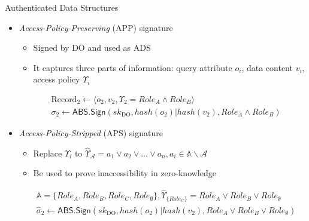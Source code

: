 \documentclass[xcolor={dvipsnames},aspectratio=169,10pt]{beamer}
\begin{document}
\begin{frame}{Authenticated Data Structures}
  \begin{itemize}
    \item<+-> \emph{Access-Policy-Preserving} (APP) signature
      \begin{itemize}
        \item Signed by DO and used as \alert{ADS}
        \item It captures three parts of information: \alert{query attribute $o_i$}, \alert{data content $v_i$}, \alert{access policy $\Upsilon_i$}
      \end{itemize}
      \begin{example}
        \begin{align*}
         & \text{Record}_2 \gets \langle o_2, v_2, \Upsilon_2 = {Role}_A \land {Role}_B \rangle                  \\
         & \sigma_2 \gets \textsf{ABS.Sign}({sk}_{\textrm{DO}}, hash(o_2) | hash(v_2) , {Role}_A \land {Role}_B)
        \end{align*}
      \end{example}
    \item<+-> \emph{Access-Policy-Stripped} (APS) signature
      \begin{itemize}
        \item Replace $\Upsilon_i$ to \alert{$\hat{\Upsilon}_{\mathcal{A}} = a_1 \lor a_2 \lor \dots \lor a_n, a_i \in \mathbb{A}\backslash\mathcal{A}$}
        \item Be used to prove inaccessibility in \alert{zero-knowledge}
      \end{itemize}
      \begin{example}
        \begin{align*}
         & \mathbb{A} = \{ {Role}_A, {Role}_B, {Role}_C, {Role}_\emptyset \},
         \hat{\Upsilon}_{\{{Role}_C\}} = {Role}_A \lor {Role}_B \lor {Role}_\emptyset
         \\
         & \hat{\sigma}_2 \gets \textsf{ABS.Sign}({sk}_{\textrm{DO}}, hash(o_2) | hash(v_2) , {Role}_A \lor {Role}_B \lor {Role}_\emptyset)
        \end{align*}
      \end{example}
  \end{itemize}
\end{frame}
\end{document}
